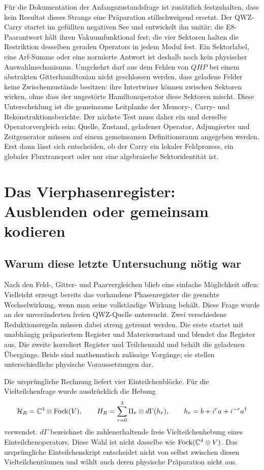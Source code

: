 Für die Dokumentation der Anfangszustandsfrage ist zusätzlich festzuhalten,
dass kein Resultat dieses Strangs eine Präparation stillschweigend ersetzt.
Der QWZ-Carry startet im gefüllten negativen See und entwickelt ihn unitär;
die E8-Paarantwort hält ihren Vakuumfunktional fest; die vier Sektoren halten
die Restriktion desselben geraden Operators in jedem Modul fest. Ein
Sektorlabel, eine Arf-Summe oder eine normierte Antwort ist deshalb noch kein
physischer Auswahlmechanismus. Umgekehrt darf aus dem Fehlen von
\(QHP\) bei einem abstrakten Gitterhamiltonian nicht geschlossen werden, dass
geladene Felder keine Zwischenzustände besitzen: ihre Intertwiner können
zwischen Sektoren wirken, ohne dass der ungestörte Hamiltonoperator diese
Sektoren mischt. Diese Unterscheidung ist die gemeinsame Leitplanke der
Memory-, Carry- und Rekonstruktionsberichte. Der nächste Test muss daher ein
und derselbe Operatorvergleich sein: Quelle, Zustand, geladener Operator,
Adjungierter und Zeitgenerator müssen auf einem gemeinsamen Definitionsraum
angegeben werden. Erst dann lässt sich entscheiden, ob der Carry ein lokaler
Feldprozess, ein globaler Fluxtransport oder nur eine algebraische
Sektoridentität ist.


\chapter{Das Vierphasenregister: Ausblenden oder gemeinsam kodieren}
\label{ch:register}
\section{Warum diese letzte Untersuchung nötig war}
Nach den Feld-, Gitter- und Paarvergleichen blieb eine einfache Möglichkeit offen: Vielleicht erzeugt bereits das vorhandene Phasenregister die gesuchte Wechselwirkung, wenn man seine vollständige Wirkung behält. Diese Frage wurde an der unveränderten freien QWZ-Quelle untersucht. Zwei verschiedene Reduktionsregeln müssen dabei streng getrennt werden. Die erste startet mit unabhängig präpariertem Register und Materiezustand und blendet das Register aus. Die zweite korreliert Register und Teilchenzahl und behält die geladenen Übergänge. Beide sind mathematisch zulässige Vorgänge; sie stellen unterschiedliche physische Voraussetzungen dar. 

Die ursprüngliche Rechnung liefert vier Einteilchenblöcke. Für die Vielteilchenfrage wurde ausdrücklich die Hebung
\[
 \mathcal H_R=\mathbb C^4\otimes\operatorname{Fock}(V),\qquad
 H_R=\sum_{r=0}^3\Pi_r\otimes d\Gamma(h_r),\qquad
 h_r=b+i^ra+i^{-r}a^\dagger
\]
verwendet. $d\Gamma$ bezeichnet die zahlenerhaltende freie Vielteilchenhebung eines Einteilchenoperators. Diese Wahl ist nicht dasselbe wie $\operatorname{Fock}(\mathbb C^4\otimes V)$. Das ursprüngliche Einteilchenskript entscheidet nicht von selbst zwischen diesen Vielteilchenräumen und wählt auch deren physische Präparation nicht aus.

